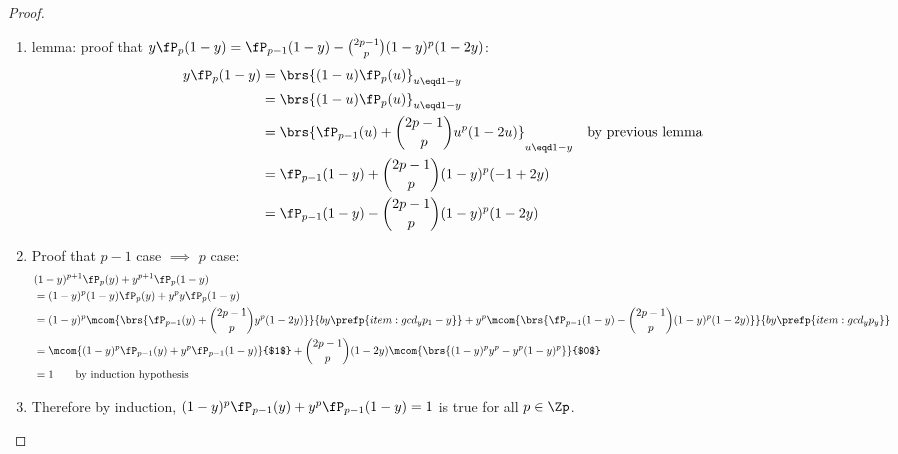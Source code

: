 \begin{proof}
\begin{enumerate}
\begin{enumerate}
\begin{enumerate}
            \item lemma: proof that $y\fP_p(1-y)=\fP_{p-1}(1-y) - {2p-1 \choose p}(1-y)^p(1-2y)$: \label{item:gcd_yp_y}
              \begin{align*}
                y\fP_p(1-y)
                  &= \brs{(1-u)\fP_p(u)}_{u\eqd 1-y}
                \\&= \brs{(1-u)\fP_p(u)}_{u\eqd 1-y}
                \\&= \brs{\fP_{p-1}(u) + {2p-1 \choose p}u^p(1-2u)}_{u\eqd 1-y}
                  && \text{by previous lemma}
                \\&= \fP_{p-1}(1-y) + {2p-1 \choose p}(1-y)^p(-1+2y)
                \\&= \fP_{p-1}(1-y) - {2p-1 \choose p}(1-y)^p(1-2y)
              \end{align*}

            \item Proof that $p-1$ case $\implies$ $p$ case:
              \begin{align*}
                &(1-y)^{p+1} \fP_{p}(y) + y^{p+1} \fP_{p}(1-y)
                \\&= (1-y)^{p}(1-y) \fP_{p}(y) + y^{p}y \fP_{p}(1-y)
                \\&= (1-y)^{p}\mcom{\brs{\fP_{p-1}(y) + {2p-1 \choose p}y^p(1-2y)}}{by \prefp{item:gcd_yp_1-y}} 
                   +  y^{p}   \mcom{\brs{\fP_{p-1}(1-y) - {2p-1 \choose p}(1-y)^p(1-2y)}}{by \prefp{item:gcd_yp_y}}
                \\&= \mcom{(1-y)^{p}\fP_{p-1}(y)+y^{p}\fP_{p-1}(1-y)}{$1$}
                   + {2p-1 \choose p}(1-2y)\mcom{\brs{(1-y)^py^p -y^p(1-y)^p}}{$0$}
                \\&= 1
                  \qquad \text{by induction hypothesis}
              \end{align*}

            \item Therefore by induction, 
                  $(1-y)^{p} \fP_{p-1}(y) + y^{p} \fP_{p-1}(1-y)=1$
                  is true for all $p\in\Zp$.
          \end{enumerate}


\end{enumerate}
\end{enumerate}
\end{proof}
